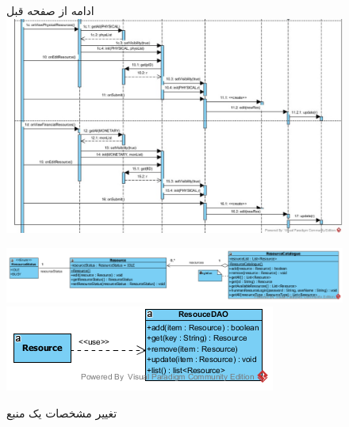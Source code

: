 \begin{landscape}
\begin{figure}[H]
ادامه از صفحه قبل\\
	\includegraphics[scale=0.68]{img/sequence-design/EditResourceAttributes-2}
\end{figure}
\begin{figure}[H]
	\centering
	\includegraphics[scale=0.7]{img/sequence-design/EditResourceAttributesC}
	\includegraphics[scale=0.7]{img/sequence-design/EditResourceAttributesD}
	\caption{تغییر مشخصات یک منبع}
\end{figure}
\end{landscape}

